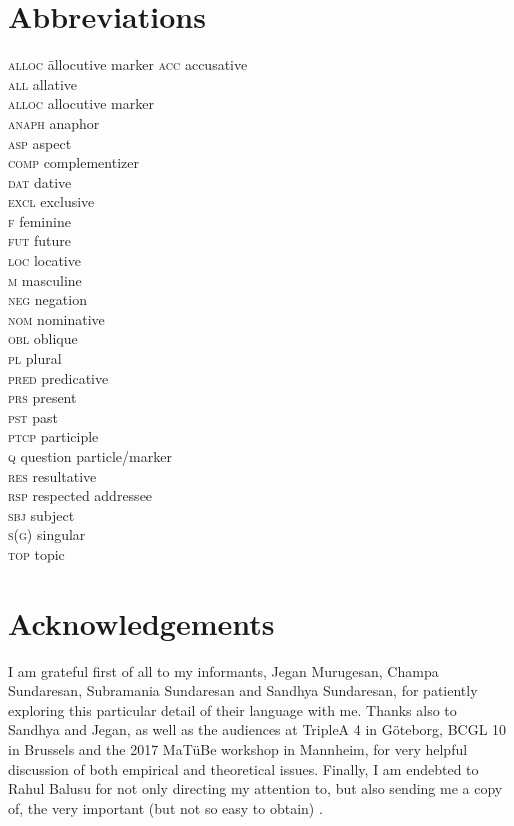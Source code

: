 \documentclass[output=paper, modfonts, nonflat]{langsci/langscibook}
\begin{document}
\section*{Abbreviations}
\begin{multicols}{2}
	\begin{tabbing}
\textsc{alloc}\hspace{5mm} \= allocutive marker\kill
	\textsc{acc} \> accusative\\
		\textsc{all} \> allative\\
  \textsc{alloc} \> allocutive marker\\
  \textsc{anaph} \> anaphor\\
  \textsc{asp} \> aspect\\
  	\textsc{comp} \> complementizer\\
  \textsc{dat} \> dative\\
  \textsc{excl} \> exclusive\\
  	\textsc{f} \> feminine\\
  	\textsc{fut} \> future\\
  	\textsc{loc} \> locative\\
  		\textsc{m} \> masculine\\
  		\textsc{neg} \> negation\\
  			\textsc{nom} \> nominative\\
  			\textsc{obl} \> oblique\\
  			\textsc{pl} \> plural\\
  			\textsc{pred} \> predicative\\
  			\textsc{prs} \> present\\
  \textsc{pst} \> past\\
  \textsc{ptcp} \> participle\\
  \textsc{q} \> question particle/marker\\
  \textsc{res} \> resultative\\
  \textsc{rsp} \> respected addressee\\
  	\textsc{sbj} \> subject\\
  		\textsc{s(g)} \> singular\\
  			\textsc{top} \> topic\\
	\end{tabbing} 
\end{multicols}

\section*{Acknowledgements}

I am grateful first of all to my informants, Jegan Murugesan, Champa
Sundaresan, Subramania Sundaresan and Sandhya Sundaresan, for
patiently exploring this particular detail of their language with
me. Thanks also to Sandhya and Jegan, as well as the audiences at
TripleA 4 in Göteborg, BCGL 10 in Brussels and the 2017 MaTüBe
workshop in Mannheim, for very helpful discussion of both empirical
and theoretical issues. Finally, I am endebted to Rahul Balusu for not
only directing my attention to, but also sending me a copy of, the
very important (but not so easy to obtain) \citet{amrit:1991}.

{\sloppy\printbibliography[heading=subbibliography,notkeyword=this]}
\end{document}
